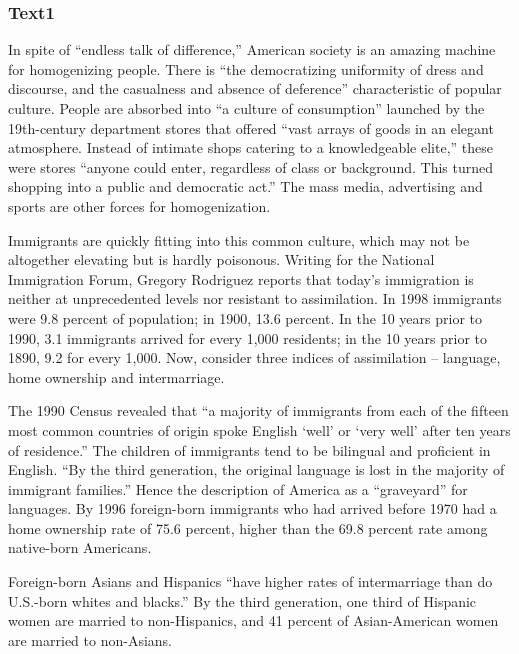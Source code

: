\documentclass[a4paper]{article}
\begin{document}
\subsubsection{Text1}

\par
In spite of “endless talk of difference,” American society is an amazing machine for homogenizing people. There is “the democratizing uniformity of dress and discourse, and the casualness and absence of deference” characteristic of popular culture. People are absorbed into “a culture of consumption” launched by the 19th-century department stores that offered “vast arrays of goods in an elegant atmosphere. Instead of intimate shops catering to a knowledgeable elite,” these were stores “anyone could enter, regardless of class or background. This turned shopping into a public and democratic act.” The mass media, advertising and sports are other forces for homogenization.

\par
Immigrants are quickly fitting into this common culture, which may not be altogether elevating but is hardly poisonous. Writing for the National Immigration Forum, Gregory Rodriguez reports that today’s immigration is neither at unprecedented levels nor resistant to assimilation. In 1998 immigrants were 9.8 percent of population; in 1900, 13.6 percent. In the 10 years prior to 1990, 3.1 immigrants arrived for every 1,000 residents; in the 10 years prior to 1890, 9.2 for every 1,000. Now, consider three indices of assimilation -- language, home ownership and intermarriage.

\par
The 1990 Census revealed that “a majority of immigrants from each of the fifteen most common countries of origin spoke English ‘well’ or ‘very well’ after ten years of residence.” The children of immigrants tend to be bilingual and proficient in English. “By the third generation, the original language is lost in the majority of immigrant families.” Hence the description of America as a “graveyard” for languages. By 1996 foreign-born immigrants who had arrived before 1970 had a home ownership rate of 75.6 percent, higher than the 69.8 percent rate among native-born Americans.

\par
Foreign-born Asians and Hispanics “have higher rates of intermarriage than do U.S.-born whites and blacks.” By the third generation, one third of Hispanic women are married to non-Hispanics, and 41 percent of Asian-American women are married to non-Asians.
\end{document}
